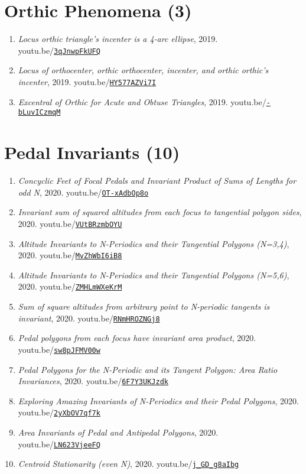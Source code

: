 \documentclass[12pt]{article}
\begin{document}
\section{Orthic Phenomena (3)}

\begin{enumerate}[resume]
\item \textit{Locus orthic triangle's incenter is a 4-arc ellipse}, 2019. youtu.be/\href{https://youtu.be/3qJnwpFkUFQ}{\nolinkurl{3qJnwpFkUFQ}}
\item \textit{Locus of orthocenter, orthic orthocenter, incenter, and orthic orthic's incenter}, 2019. youtu.be/\href{https://youtu.be/HY577AZVi7I}{\nolinkurl{HY577AZVi7I}}
\item \textit{Excentral of Orthic for Acute and Obtuse Triangles}, 2019. youtu.be/\href{https://youtu.be/-bLuvICzmqM}{\nolinkurl{-bLuvICzmqM}}
\end{enumerate}

\section{Pedal Invariants (10)}

\begin{enumerate}[resume]
\item \textit{Concyclic Feet of Focal Pedals and Invariant Product of Sums of Lengths for odd N}, 2020. youtu.be/\href{https://youtu.be/OT-xAdbOp8o}{\nolinkurl{OT-xAdbOp8o}}
\item \textit{Invariant sum of squared altitudes from each focus to tangential polygon sides}, 2020. youtu.be/\href{https://youtu.be/VUtBRzmbOYU}{\nolinkurl{VUtBRzmbOYU}}
\item \textit{Altitude Invariants to N-Periodics and their Tangential Polygons (N=3,4)}, 2020. youtu.be/\href{https://youtu.be/MvZhWbI6iB8}{\nolinkurl{MvZhWbI6iB8}}
\item \textit{Altitude Invariants to N-Periodics and their Tangential Polygons (N=5,6)}, 2020. youtu.be/\href{https://youtu.be/ZMHLmWXeKrM}{\nolinkurl{ZMHLmWXeKrM}}
\item \textit{Sum of square altitudes from arbitrary point to N-periodic tangents is invariant}, 2020. youtu.be/\href{https://youtu.be/RNmHROZNGj8}{\nolinkurl{RNmHROZNGj8}}
\item \textit{Pedal polygons from each focus have invariant area product}, 2020. youtu.be/\href{https://youtu.be/sw8pJFMV00w}{\nolinkurl{sw8pJFMV00w}}
\item \textit{Pedal Polygons for the N-Periodic and its Tangent Polygon: Area Ratio Invariances}, 2020. youtu.be/\href{https://youtu.be/6F7Y3UKJzdk}{\nolinkurl{6F7Y3UKJzdk}}
\item \textit{Exploring Amazing Invariants of N-Periodics and their Pedal Polygons}, 2020. youtu.be/\href{https://youtu.be/2yXbOV7qf7k}{\nolinkurl{2yXbOV7qf7k}}
\item \textit{Area Invariants of Pedal and Antipedal Polygons}, 2020. youtu.be/\href{https://youtu.be/LN623VjeeFQ}{\nolinkurl{LN623VjeeFQ}}
\item \textit{Centroid Stationarity (even N)}, 2020. youtu.be/\href{https://youtu.be/j_GD_g8aIbg}{\nolinkurl{j\_GD\_g8aIbg}}
\end{enumerate}
\end{document}
